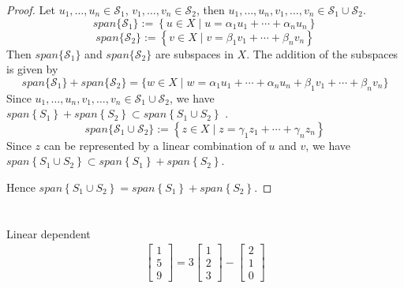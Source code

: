 \documentclass{article}
\theoremstyle{definition} %
\begin{document}
\begin{proof}
    Let $u_1, \ldots, u_n \in \mathcal{S}_1$, $v_1, \ldots, v_n \in \mathcal{S}_2$, then $u_1, \ldots, u_n, v_1, \ldots, v_n \in \mathcal{S}_1 \cup \mathcal{S}_2 $.
    $$span\{\mathcal{S}_1\}:=\left\{u \in X \mid  u=\alpha_1 u_1+\cdots+\alpha_n u_n\right\}$$
    $$span\{\mathcal{S}_2\}:=\left\{v \in X \mid  v=\beta_1 v_1+\cdots+\beta_n v_n\right\}$$
    Then $span\{\mathcal{S}_1\}$ and $span\{\mathcal{S}_2\}$ are subspaces in $X$. The addition of the subspaces is given by
    $$span\{\mathcal{S}_1\}+span\{\mathcal{S}_2\} = \{w \in X\mid w = \alpha_1 u_1+\cdots+\alpha_n u_n + \beta_{1} v_1+\cdots+\beta_{n}v_n\}$$
    Since $u_1, \ldots, u_n, v_1, \ldots, v_n \in \mathcal{S}_1 \cup \mathcal{S}_2 $, we have
    $span\left\{S_1\right\}+span\left\{S_2\right\} \subset span\left\{S_1 \cup S_2\right\}$ . \\
    $$span\{\mathcal{S}_1 \cup  \mathcal{S}_2\}:=\left\{z \in X \mid  z=\gamma_1 z_1+\cdots+\gamma_n z_n\right\}$$
    Since $z$ can be represented by a linear combination of $u$ and $v$, we have $span\left\{S_1 \cup S_2\right\} \subset span\left\{S_1\right\}+span\left\{S_2\right\}$.
    
    Hence $span\left\{S_1 \cup S_2\right\} = span\left\{S_1\right\}+span\left\{S_2\right\}$.
\end{proof}

\section{}
\subsection{}
Linear dependent
\begin{align*}
    \begin{bmatrix}
        1\\5\\9
    \end{bmatrix}
    =
    3
    \begin{bmatrix}
        1\\2\\3    
    \end{bmatrix}-
    \begin{bmatrix}
        2\\1\\0
    \end{bmatrix}
\end{align*}
\end{document}

